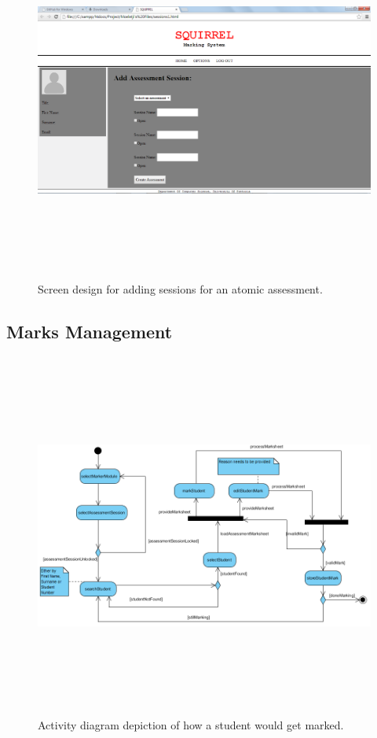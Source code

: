 \documentclass[12pt]{article}
\begin{document}
	\pagebreak
		\begin{figure}[htbp]
		\centering
		\includegraphics[width=1.0\linewidth, height=12cm]{./Diagrams/web_assessmentSession}
		\caption{Screen design for adding sessions for an atomic assessment.}
		\label{fig:web_assessmentSession}
		\end{figure}
	
	\newpage
	\subsection{Marks Management}
	
		\begin{figure}[htbp]
		\centering
		\includegraphics[width=1.0\linewidth, height=12cm]{./Diagrams/uml_markManagement}
		\caption{Activity diagram depiction of how a student would get marked.}
		\label{fig:uml_markManagement}
		\end{figure}
			
\end{document}
